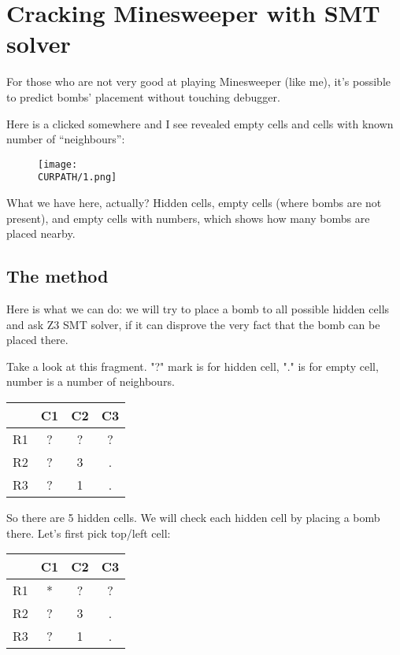 \section{Cracking Minesweeper with SMT solver}
\label{minesweeper_SMT}

\renewcommand{\CURPATH}{equations/minesweeper_SMT}

For those who are not very good at playing Minesweeper (like me), it's possible to predict bombs' placement without touching debugger.

Here is a clicked somewhere and I see revealed empty cells and cells with known number of ``neighbours'':

\begin{figure}[H]
\centering
\texttt{[image: \\CURPATH/1.png]}
\end{figure}

What we have here, actually? Hidden cells, empty cells (where bombs are not present), and empty cells with numbers, which shows how many bombs are placed nearby.

\subsection{The method}

Here is what we can do: we will try to place a bomb to all possible hidden cells and ask Z3 SMT solver, if it can disprove the very fact that the bomb can be placed there.

Take a look at this fragment. "?" mark is for hidden cell, "." is for empty cell, number is a number of neighbours.

\begin{center}
\begin{tabular}{ | c | c | c | c | }
\hline
 & C1 & C2 & C3 \\
\hline
R1 & ? & ? & ? \\
\hline
R2 & ? & 3 & . \\
\hline
R3 & ? & 1 & . \\
\hline
\end{tabular}
\end{center}

So there are 5 hidden cells.
We will check each hidden cell by placing a bomb there.
Let's first pick top/left cell:

\begin{center}
\begin{tabular}{ | c | c | c | c | }
\hline
 & C1 & C2 & C3 \\
\hline
R1 & * & ? & ? \\
\hline
R2 & ? & 3 & . \\
\hline
R3 & ? & 1 & . \\
\hline
\end{tabular}
\end{center}

